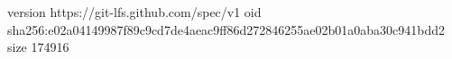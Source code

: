 version https://git-lfs.github.com/spec/v1
oid sha256:e02a04149987f89c9cd7de4aeac9ff86d272846255ae02b01a0aba30c941bdd2
size 174916
